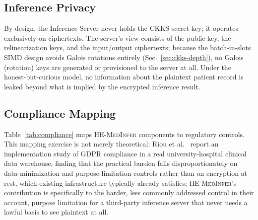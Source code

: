 \documentclass[journal,compsoc]{IEEEtran}
\newcommand{\framework}{\textsc{HE-MedInfer}}
\begin{document}
\subsection{Inference Privacy}

By design, the Inference Server never holds the CKKS secret key; it operates
exclusively on ciphertexts. The server's view consists of the public key, the
relinearization keys, and the input/output ciphertexts; because the
batch-in-slots SIMD design avoids Galois rotations entirely
(Sec.~\ref{sec:ckks-depth}), no Galois (rotation) keys are generated or
provisioned to the server at all. Under the honest-but-curious model, no information about the
plaintext patient record is leaked beyond what is implied by the encrypted
inference result.

\subsection{Compliance Mapping}

Table~\ref{tab:compliance} maps \framework{} components to regulatory
controls. This mapping exercise is not merely theoretical: Riou et
al.~\cite{riou2025gdpr} report an implementation study of GDPR compliance in
a real university-hospital clinical data warehouse, finding that the
practical burden falls disproportionately on data-minimization and
purpose-limitation controls rather than on encryption at rest, which
existing infrastructure typically already satisfies; \framework{}'s
contribution is specifically to the harder, less commonly addressed control
in their account, purpose limitation for a third-party inference server that
never needs a lawful basis to see plaintext at all.
\end{document}
